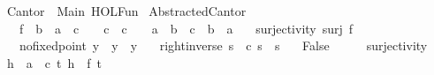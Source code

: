 %
\begin{isabellebody}%
%
%
\isadelimtheory
%
\endisadelimtheory
%
\isatagtheory
{}\isamarkupfalse%
\ Cantor\ \ Main\ HOL{\isachardot}{\kern0pt}Fun\isanewline
{}%
\endisatagtheory
{\isafoldtheory}%
%
\isadelimtheory
\isanewline
%
\endisadelimtheory
\isanewline
\isanewline
{}\isamarkupfalse%
\ {\isachardoublequoteopen}Abstracted{\isacharunderscore}{\kern0pt}Cantor{\isachardoublequoteclose}{\isacharcolon}{\kern0pt}\isanewline
\ \ \ f\ {\isacharcolon}{\kern0pt}{\isacharcolon}{\kern0pt}\ {\isachardoublequoteopen}{\isacharprime}{\kern0pt}b\ {\isasymRightarrow}\ {\isacharprime}{\kern0pt}a\ {\isasymRightarrow}\ {\isacharprime}{\kern0pt}c{\isachardoublequoteclose}\ \ {\isasymalpha}\ {\isacharcolon}{\kern0pt}{\isacharcolon}{\kern0pt}\ {\isachardoublequoteopen}{\isacharprime}{\kern0pt}c\ {\isasymRightarrow}\ {\isacharprime}{\kern0pt}c{\isachardoublequoteclose}\ \ {\isasymbeta}\ {\isacharcolon}{\kern0pt}{\isacharcolon}{\kern0pt}\ {\isachardoublequoteopen}{\isacharprime}{\kern0pt}a\ {\isasymRightarrow}\ {\isacharprime}{\kern0pt}b{\isachardoublequoteclose}\ \ {\isasymbeta}{\isacharunderscore}{\kern0pt}c\ {\isacharcolon}{\kern0pt}{\isacharcolon}{\kern0pt}\ {\isachardoublequoteopen}{\isacharprime}{\kern0pt}b\ {\isasymRightarrow}\ {\isacharprime}{\kern0pt}a{\isachardoublequoteclose}\isanewline
\ \ \ surjectivity{\isacharcolon}{\kern0pt}\ {\isachardoublequoteopen}surj\ f{\isachardoublequoteclose}\isanewline
\ \ \ no{\isacharunderscore}{\kern0pt}fixed{\isacharunderscore}{\kern0pt}point{\isacharcolon}{\kern0pt}\ {\isachardoublequoteopen}{\isasymforall}y{\isachardot}{\kern0pt}\ {\isasymalpha}\ y\ {\isasymnoteq}\ y{\isachardoublequoteclose}\isanewline
\ \ \ right{\isacharunderscore}{\kern0pt}inverse{\isacharcolon}{\kern0pt}\ {\isachardoublequoteopen}{\isasymforall}s{\isachardot}{\kern0pt}\ {\isasymbeta}\ {\isacharparenleft}{\kern0pt}{\isasymbeta}{\isacharunderscore}{\kern0pt}c\ s{\isacharparenright}{\kern0pt}\ {\isacharequal}{\kern0pt}\ s{\isachardoublequoteclose}\isanewline
\ \ \ {\isachardoublequoteopen}False{\isachardoublequoteclose}\isanewline
%
\isadelimproof
%
\endisadelimproof
%
\isatagproof
{}\isamarkupfalse%
\ {\isacharminus}{\kern0pt}\isanewline
\ \ \isamarkupfalse%
\ surjectivity\ \isamarkupfalse%
\ {\isachardoublequoteopen}{\isasymforall}h\ {\isacharcolon}{\kern0pt}{\isacharcolon}{\kern0pt}\ {\isacharprime}{\kern0pt}a\ {\isasymRightarrow}\ {\isacharprime}{\kern0pt}c{\isachardot}{\kern0pt}\ {\isasymexists}t{\isachardot}{\kern0pt}\ h\ {\isacharequal}{\kern0pt}\ f\ t{\isachardoublequoteclose}\ \isamarkupfalse%

\end{isabellebody}
